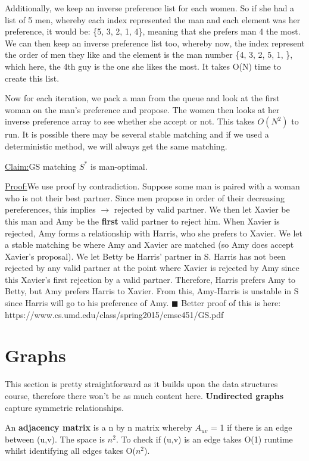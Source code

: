 \documentclass[11pt, oneside]{article}
\theoremstyle{definition}
\newenvironment{claim}[1]{\par\noindent\underline{Claim:}\space#1}{}
\newenvironment{claimproof}[1]{\par\noindent\underline{Proof:}\space#1}{\hfill $\blacksquare$}
\begin{document}
Additionally, we keep an inverse preference list for each women. So if she had a list of 5 men, whereby each index represented the man and each element was her preference, it would be: \{5, 3, 2, 1, 4\}, meaning that she prefers man 4 the most. We can then keep an inverse preference list too, whereby now, the index represent the order of men they like and the element is the man number \{4, 3, 2, 5, 1, \}, which here, the 4th guy is the one she likes the most. It takes O(N) time to create this list.

Now for each iteration, we pack a man from the queue and look at the first woman on the man's preference and propose. The women then looks at her inverse preference array to see whether she accept or not. This takes $O(N^2)$ to run. It is possible there may be several stable matching and if we used a deterministic method, we will always get the same matching.

\begin{claim}
  GS matching $S^*$ is man-optimal.
\end{claim}
\begin{claimproof}
  We use proof by contradiction. Suppose some man is paired with a woman who is not their best partner. Since men propose in order of their decreasing pereferences, this implies $\rightarrow$ rejected by valid partner. We then let Xavier be this man and Amy be the \textbf{first} valid partner to reject him. When Xavier is rejected, Amy forms a relationship with Harris, who she prefers to Xavier. We let a stable matching be where Amy and Xavier are matched (so Amy does accept Xavier's proposal). We let Betty be Harris' partner in S. Harris has not been rejected by any valid partner at the point where Xavier is rejected by Amy since this Xavier's first rejection by a valid partner. Therefore, Harris prefers Amy to Betty, but Amy prefers Harris to Xavier. From this, Amy-Harris is unstable in S since Harris will go to his preference of Amy.
\end{claimproof}
Better proof of this is here: https://www.cs.umd.edu/class/spring2015/cmsc451/GS.pdf
\newpage
\section{Graphs}
This section is pretty straightforward as it builds upon the data structures course, therefore there won't be as much content here.
\textbf{Undirected graphs} capture symmetric relationships.

An \textbf{adjacency matrix} is a n by n matrix whereby $A_{uv}$ = 1 if there is an edge between (u,v). The space is $n^2$. To check if (u,v) is an edge takes O(1) runtime whilst identifying all edges takes O($n^2$).
\end{document}
